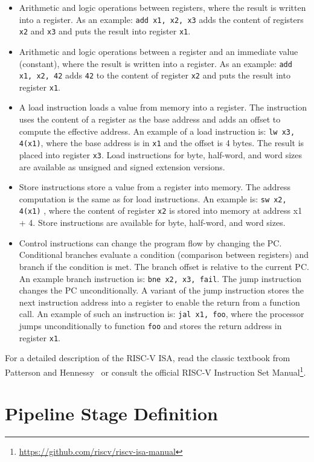 \documentclass[%
    10pt,
    headinclude, footinclude=false,
    openright, %
    notitlepage,
    cleardoublepage=empty,
    headsepline,
    numbers=noenddot,
    bibliography=totoc, index=totoc,
    ]{scrbook}
\newcommand{\code}[1]{{\lstinline[basicstyle=\small\ttfamily]{#1}}}
\newcommand{\myref}[2]{\href{#1}{#2}}
\renewcommand{\myref}[2]{{#2}{\footnote{\url{#1}}}}
\begin{document}
\begin{itemize}
\item Arithmetic and logic operations between registers, where the result is written into a register.
As an example: \code{add x1, x2, x3} adds the content of registers \code{x2} and \code{x3} and
puts the result into register \code{x1}.
\item Arithmetic and logic operations between a register and an immediate value (constant),
where the result is written into a register.
As an example: \code{add x1, x2, 42} adds \code{42} to the content of register \code{x2} and
puts the result into register \code{x1}.
\item A load instruction loads a value from memory into a register. The instruction uses the content
of a register as the base address and adds an offset to compute the effective address.
An example of a load instruction is: \code{lw x3, 4(x1)}, where the base address is in \code{x1}
and the offset is 4 bytes. The result is placed into register \code{x3}. Load instructions
for byte, half-word, and word sizes are available as unsigned and signed extension versions.
\item Store instructions store a value from a register into memory. The address computation is
the same as for load instructions. An example is: \code{sw x2, 4(x1)} , where the content of
register \code{x2} is stored into memory at address {x1 + 4}. Store instructions are
available for byte, half-word, and word sizes.
\item Control instructions can change the program flow by changing the PC.
Conditional branches evaluate a condition (comparison between registers) and branch if
the condition is met. The branch offset is relative to the current PC. An example branch
instruction is: \code{bne x2, x3, fail}.
The jump instruction changes the PC unconditionally.
A variant of the jump instruction stores the next instruction address into a register to
enable the return from a function call. An example of such an instruction is:
\code{jal x1, foo}, where the processor jumps unconditionally to function \code{foo}
and stores the return address in register \code{x1}.
\end{itemize}

For a detailed description of the RISC-V ISA, read the classic textbook from Patterson and
Hennessy~\cite{Patterson20} or consult the official
\myref{https://github.com/riscv/riscv-isa-manual}{RISC-V Instruction Set Manual}.

\section{Pipeline Stage Definition}
\end{document}
